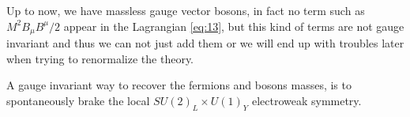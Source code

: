 Up to now, we have massless gauge vector bosons, in fact no term such as
$M^{2} B_{\mu}B^{\mu} / 2$ appear in the Lagrangian \eqref{eq:13}, but this kind
of terms are not gauge invariant and thus we can not just add them or we will
end up with troubles later when trying to renormalize the theory.

A gauge invariant way to recover the fermions and bosons masses, is to
spontaneously brake the local $SU(2)_{L} \times U(1)_{Y}$ electroweak symmetry.
